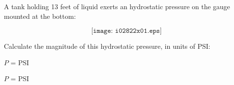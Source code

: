 

A tank holding 13 feet of liquid exerts an hydrostatic pressure on the gauge mounted at the bottom:

$$\texttt{[image: i02822x01.eps]}$$

Calculate the magnitude of this hydrostatic pressure, in units of PSI:

\vskip 10pt

$P$ = \underbar{\hskip 50pt} PSI

\vskip 10pt







$P$ =  PSI
 











